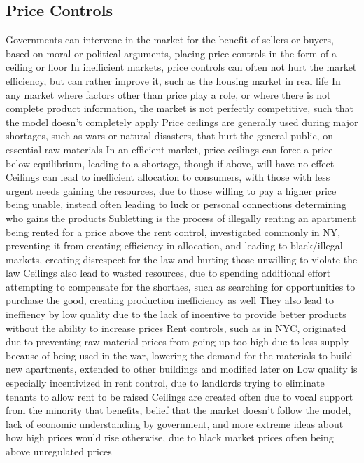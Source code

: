 \documentclass[11 pt, twoside]{article}
\newenvironment{outline*}
{
	\begin{outline}[enumerate]
	}
	{\end{outline}
}
\begin{document}
\subsection{Price Controls}
\begin{outline*}
\1 Governments can intervene in the market for the benefit of sellers or buyers, based on moral or political arguments, placing price controls in the form of a ceiling or floor
\2 In inefficient markets, price controls can often not hurt the market efficiency, but can rather improve it, such as the housing market in real life
\2 In any market where factors other than price play a role, or where there is not complete product information, the market is not perfectly competitive, such that the model doesn't completely apply
\1 Price ceilings are generally used during major shortages, such as wars or natural disasters, that hurt the general public, on essential raw materials
\2 In an efficient market, price ceilings can force a price below equilibrium, leading to a shortage, though if above, will have no effect
\2 Ceilings can lead to inefficient allocation to consumers, with those with less urgent needs gaining the resources, due to those willing to pay a higher price being unable, instead often leading to luck or personal connections determining who gains the products
\2 Subletting is the process of illegally renting an apartment being rented for a price above the rent control, investigated commonly in NY, preventing it from creating efficiency in allocation, and leading to black/illegal markets, creating disrespect for the law and hurting those unwilling to violate the law
\2 Ceilings also lead to wasted resources, due to spending additional effort attempting to compensate for the shortaes, such as searching for opportunities to purchase the good, creating production inefficiency as well
\2 They also lead to ineffiency by low quality due to the lack of incentive to provide better products without the ability to increase prices
\1 Rent controls, such as in NYC, originated due to preventing raw material prices from going up too high due to less supply because of being used in the war, lowering the demand for the materials to build new apartments, extended to other buildings and modified later on
\2 Low quality is especially incentivized in rent control, due to landlords trying to eliminate tenants to allow rent to be raised
\1 Ceilings are created often due to vocal support from the minority that benefits, belief that the market doesn't follow the model, lack of economic understanding by government, and more extreme ideas about how high prices would rise otherwise, due to black market prices often being above unregulated prices

\end{outline*}
\end{document}
